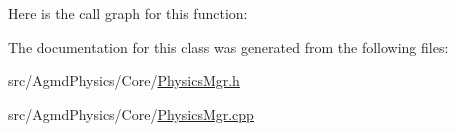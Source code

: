 Here is the call graph for this function\+:




The documentation for this class was generated from the following files\+:\begin{DoxyCompactItemize}
\item 
src/\+Agmd\+Physics/\+Core/\hyperlink{_agmd_physics_2_core_2_physics_mgr_8h}{Physics\+Mgr.\+h}\item 
src/\+Agmd\+Physics/\+Core/\hyperlink{_agmd_physics_2_core_2_physics_mgr_8cpp}{Physics\+Mgr.\+cpp}\end{DoxyCompactItemize}
